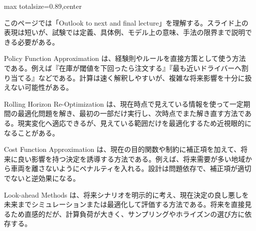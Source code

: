 \begin{minipage}[t]{0.58\textwidth}
\begin{adjustbox}{max totalsize={\textwidth}{0.89\textheight},center}
\begin{minipage}{\textwidth}\scriptsize
{}このページでは「Outlook to next and final lecture」を理解する。スライド上の表現は短いが、試験では定義、具体例、モデル上の意味、手法の限界まで説明できる必要がある。\par
Policy Function Approximation は、経験則やルールを直接方策として使う方法である。例えば『在庫が閾値を下回ったら注文する』『最も近いドライバーへ割り当てる』などである。計算は速く解釈しやすいが、複雑な将来影響を十分に扱えない可能性がある。\par
Rolling Horizon Re-Optimization は、現在時点で見えている情報を使って一定期間の最適化問題を解き、最初の一部だけ実行し、次時点でまた解き直す方法である。現実変化へ適応できるが、見えている範囲だけを最適化するため近視眼的になることがある。\par
Cost Function Approximation は、現在の目的関数や制約に補正項を加えて、将来に良い影響を持つ決定を誘導する方法である。例えば、将来需要が多い地域から車両を離さないようにペナルティを入れる。設計は問題依存で、補正項が適切でないと逆効果になる。\par
Look-ahead Methods は、将来シナリオを明示的に考え、現在決定の良し悪しを未来までシミュレーションまたは最適化して評価する方法である。将来を直接見るため直感的だが、計算負荷が大きく、サンプリングやホライズンの選び方に依存する。\par

\end{minipage}
\end{adjustbox}
\end{minipage}
